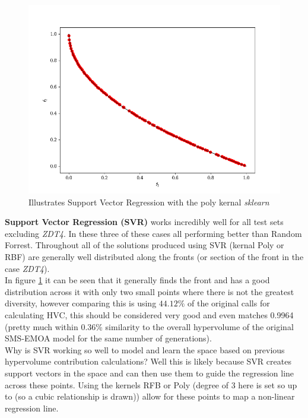 \documentclass[sigconf,review,nonacm]{acmart}
\begin{document}
\begin{figure}[h]
    \centering
    \includegraphics[width=0.7\linewidth]{Images/zvr-polykernal_1.png}
    \caption{Illustrates Support Vector Regression with the poly kernal \textit{sklearn}}
    \label{fig:svr-poly}
\end{figure}

\textbf{Support Vector Regression (SVR)} works incredibly well for all test sets excluding \textit{ZDT4}. In these three of these cases all performing better than Random Forrest. Throughout all of the solutions produced using SVR (kernal Poly or RBF) are generally well distributed along the fronts (or section of the front in the case \textit{ZDT4}). \\

\noindent In figure \ref{fig:svr-poly} it can be seen that it generally finds the front and has a good distribution across it with only two small points where there is not the greatest diversity, however comparing this is using $44.12\%$ of the original calls for calculating HVC, this should be considered very good and even matches 0.9964 (pretty much within 0.36\% similarity to the overall hypervolume of the original SMS-EMOA model for the same number of generations). \\

Why is SVR working so well to model and learn the space based on previous hypervolume contribution calculations? Well this is likely because SVR creates support vectors in the space and can then use them to guide the regression line across these points. Using the kernels RFB or Poly (degree of 3 here is set so up to (so a cubic relationship is drawn)) allow for these points to map a non-linear regression line.
\end{document}

